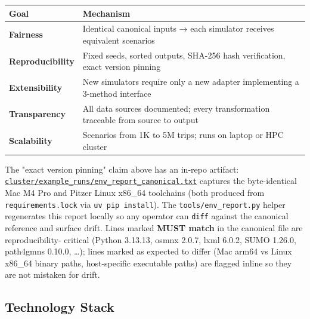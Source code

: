 \begin{longtable}[]{@{}ll@{}}
\toprule\noalign{}
Goal & Mechanism \\
\midrule\noalign{}
\endhead
\bottomrule\noalign{}
\endlastfoot
\textbf{Fairness} & Identical canonical inputs → each simulator receives
equivalent scenarios \\
\textbf{Reproducibility} & Fixed seeds, sorted outputs, SHA-256 hash
verification, exact version pinning \\
\textbf{Extensibility} & New simulators require only a new adapter
implementing a 3-method interface \\
\textbf{Transparency} & All data sources documented; every
transformation traceable from source to output \\
\textbf{Scalability} & Scenarios from 1K to 5M trips; runs on laptop or
HPC cluster \\
\end{longtable}

The "exact version pinning" claim above has an in-repo artifact:
\href{../../cluster/example_runs/env_report_canonical.txt}{\texttt{cluster/example\_runs/env\_report\_canonical.txt}}
captures the byte-identical Mac M4 Pro and Pitzer Linux x86\_64
toolchains (both produced from \texttt{requirements.lock} via
\texttt{uv\ pip\ install}). The \texttt{tools/env\_report.py} helper
regenerates this report locally so any operator can \texttt{diff}
against the canonical reference and surface drift. Lines marked
\textbf{MUST match} in the canonical file are reproducibility- critical
(Python 3.13.13, osmnx 2.0.7, lxml 6.0.2, SUMO 1.26.0, path4gmns 0.10.0,
\ldots); lines marked as expected to differ (Mac arm64 vs Linux x86\_64
binary paths, host-specific executable paths) are flagged inline so they
are not mistaken for drift.

\subsection{Technology Stack}\label{312-technology-stack}

